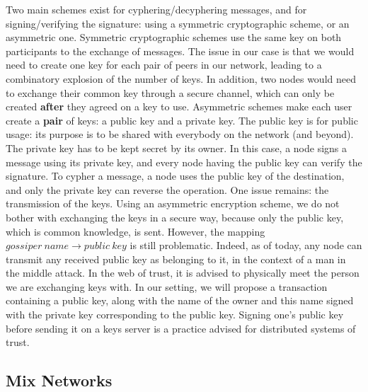 \documentclass[11pt, a4paper]{article}
\begin{document}
        Two main schemes exist for cyphering/decyphering messages, and for signing/verifying the signature: using a symmetric cryptographic scheme, or an asymmetric one.
        \bigbreak
        Symmetric cryptographic schemes use the same key on both participants to the exchange of messages.
        The issue in our case is that we would need to create one key for each pair of peers in our network, leading to a combinatory explosion of the number of keys.
        In addition, two nodes would need to exchange their common key through a secure channel, which can only be created \textbf{after} they agreed on a key to use.
        \bigbreak
        Asymmetric schemes make each user create a \textbf{pair} of keys: a public key and a private key.
        The public key is for public usage: its purpose is to be shared with everybody on the network (and beyond).
        The private key has to be kept secret by its owner.
        In this case, a node signs a message using its private key, and every node having the public key can verify the signature.
        To cypher a message, a node uses the public key of the destination, and only the private key can reverse the operation.
        \bigbreak
        One issue remains: the transmission of the keys.
        Using an asymmetric encryption scheme, we do not bother with exchanging the keys in a secure way, because only the public key, which is common knowledge, is sent.
        However, the mapping $gossiper~name \rightarrow public~key$ is still problematic.
        Indeed, as of today, any node can transmit any received public key as belonging to it, in the context of a man in the middle attack.
        \bigbreak
        In the web of trust, it is advised to physically meet the person we are exchanging keys with.
        In our setting, we will propose a transaction containing a public key, along with the name of the owner and this name signed with the private key corresponding to the public key.
        Signing one's public key before sending it on a keys server is a practice advised for distributed systems of trust.

    \subsection{Mix Networks}
\end{document}
